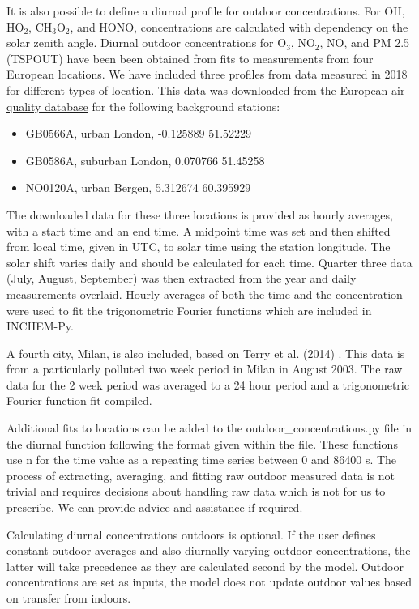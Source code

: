 \documentclass[a4paper]{refart}
\begin{document}
It is also possible to define a diurnal profile for outdoor concentrations. For OH, HO$_2$, CH$_3$O$_2$, and HONO, concentrations are calculated with dependency on the solar zenith angle. Diurnal outdoor concentrations for O$_3$, NO$_2$, NO, and PM 2.5 (TSPOUT) have been been obtained from fits to measurements from four European locations. We have included three profiles from data measured in 2018 for different types of location. This data was downloaded from the \href{https://aqportal.discomap.eea.europa.eu/products/data-viewers/statistical-viewer-expert/}{European air quality database} for the following background stations:
\begin{itemize}
    \item GB0566A, urban London, -0.125889	51.52229
    \item GB0586A, suburban London, 0.070766	51.45258
    \item NO0120A, urban Bergen, 5.312674	60.395929
\end{itemize} 
The downloaded data for these three locations is provided as hourly averages, with a start time and an end time. A midpoint time was set and then shifted from local time, given in UTC, to solar time using the station longitude. The solar shift varies daily and should be calculated for each time. Quarter three data (July, August, September) was then extracted from the year and daily measurements overlaid. Hourly averages of both the time and the concentration were used to fit the trigonometric Fourier functions which are included in INCHEM-Py. 

A fourth city, Milan, is also included, based on Terry et al. (2014) \cite{Terry2014}. This data is from a particularly polluted two week period in Milan in August 2003. The raw data for the 2 week period was averaged to a 24 hour period and a trigonometric Fourier function fit compiled. 

Additional fits to locations can be added to the outdoor\_concentrations.py file in the diurnal function following the format given within the file. These functions use n for the time value as a repeating time series between 0 and 86400 s. The process of extracting, averaging, and fitting raw outdoor measured data is not trivial and requires decisions about handling raw data which is not for us to prescribe. We can provide advice and assistance if required.

Calculating diurnal concentrations outdoors is optional. If the user defines constant outdoor averages and also diurnally varying outdoor concentrations, the latter will take precedence as they are calculated second by the model. Outdoor concentrations are set as inputs, the model does not update outdoor values based on transfer from indoors.
\end{document}
